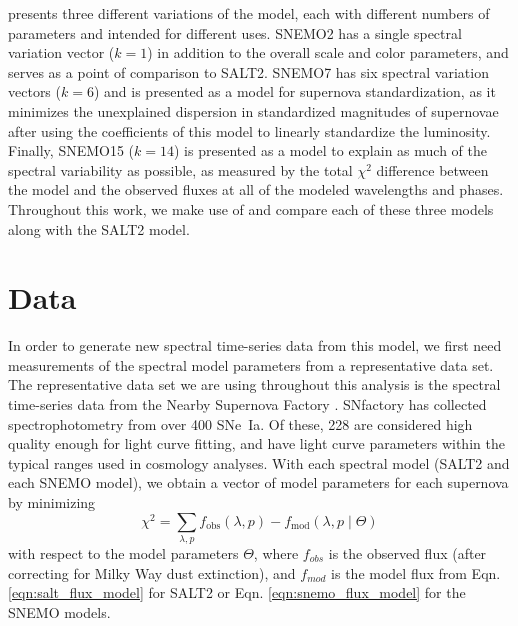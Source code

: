 \cite{saunders_snemo_2018} presents three different variations of the model, each with different numbers of parameters and intended for different uses. SNEMO2 has a single spectral variation vector ($k=1$) in addition to the overall scale and color parameters, and serves as a point of comparison to SALT2. SNEMO7 has six spectral variation vectors ($k=6$) and is presented as a model for supernova standardization, as it minimizes the unexplained dispersion in standardized magnitudes of supernovae after using the coefficients of this model to linearly standardize the luminosity. Finally, SNEMO15 ($k=14$) is presented as a model to explain as much of the spectral variability as possible, as measured by the total $\chi^2$ difference between the model and the observed fluxes at all of the modeled wavelengths and phases. Throughout this work, we make use of and compare each of these three models along with the SALT2 model.

\section{Data}
\label{sec:data}
In order to generate new spectral time-series data from this model, we first need measurements of the spectral model parameters from a representative data set. The representative data set we are using throughout this analysis is the spectral time-series data from the Nearby Supernova Factory \citep[SNfactory;][]{aldering_overview_2002}. SNfactory has collected spectrophotometry from over 400 SNe~Ia. Of these, 228 are considered high quality enough for light curve fitting, and have light curve parameters within the typical ranges used in cosmology analyses. With each spectral model (SALT2 and each SNEMO model), we obtain a vector of model parameters for each supernova by minimizing
\begin{equation}
    \chi^2 = \displaystyle\sum_{\lambda, p} f_\text{obs}(\lambda, p) - f_\text{mod}(\lambda, p\;|\; \Theta)
\end{equation}
with respect to the model parameters $\Theta$, where $f_{obs}$ is the observed flux (after correcting for Milky Way dust extinction), and $f_{mod}$ is the model flux from Eqn. \ref{eqn:salt_flux_model} for SALT2 or Eqn. \ref{eqn:snemo_flux_model} for the SNEMO models.

